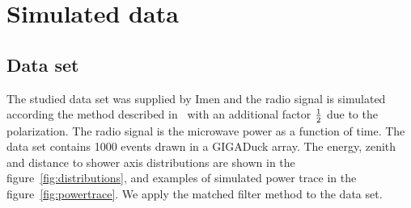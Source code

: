 \section{Simulated data}
\subsection{Data set}
The studied  data set  was supplied  by Imen and  the radio  signal is
simulated according the method described in~\cite{olivierimen} with an
additional factor $\rm \frac{1}{2}$ due to the polarization. The radio
signal is  the microwave  power as  a function of  time. The  data set
contains 1000 events drawn in a GIGADuck array. The energy, zenith and
distance   to   shower   axis   distributions   are   shown   in   the
figure~\ref{fig:distributions}, and examples  of simulated power trace
in the figure~\ref{fig:powertrace}. We apply the matched filter method
to the data set. 
